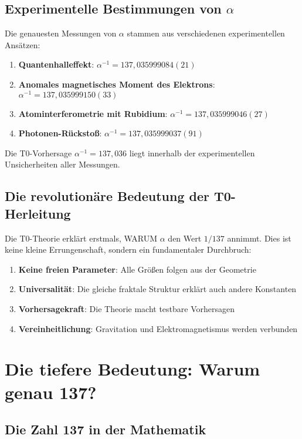 \documentclass[12pt,a4paper]{article}
\theoremstyle{definition}
\begin{document}
	\subsection{Experimentelle Bestimmungen von $\alpha$}
	
	Die genauesten Messungen von $\alpha$ stammen aus verschiedenen experimentellen Ansätzen:
	
	\begin{enumerate}
		\item \textbf{Quantenhalleffekt}: $\alpha^{-1} = 137{,}035999084(21)$
		\item \textbf{Anomales magnetisches Moment des Elektrons}: $\alpha^{-1} = 137{,}035999150(33)$
		\item \textbf{Atominterferometrie mit Rubidium}: $\alpha^{-1} = 137{,}035999046(27)$
		\item \textbf{Photonen-Rückstoß}: $\alpha^{-1} = 137{,}035999037(91)$
	\end{enumerate}
	
	Die T0-Vorhersage $\alpha^{-1} = 137{,}036$ liegt innerhalb der experimentellen Unsicherheiten aller Messungen.
	
	\subsection{Die revolutionäre Bedeutung der T0-Herleitung}
	
	Die T0-Theorie erklärt erstmals, WARUM $\alpha$ den Wert $1/137$ annimmt. Dies ist keine kleine Errungenschaft, sondern ein fundamentaler Durchbruch:
	
	\begin{enumerate}
		\item \textbf{Keine freien Parameter}: Alle Größen folgen aus der Geometrie
		\item \textbf{Universalität}: Die gleiche fraktale Struktur erklärt auch andere Konstanten
		\item \textbf{Vorhersagekraft}: Die Theorie macht testbare Vorhersagen
		\item \textbf{Vereinheitlichung}: Gravitation und Elektromagnetismus werden verbunden
	\end{enumerate}
	
	\section{Die tiefere Bedeutung: Warum genau 137?}
	
	\subsection{Die Zahl 137 in der Mathematik}
	
\end{document}

